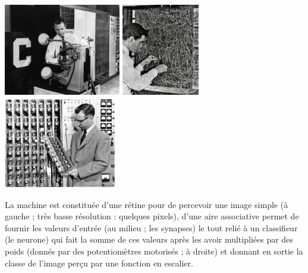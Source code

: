 \documentclass[a4paper,10pt]{report}
\theoremstyle{exo}
\theoremstyle{exercice}
\begin{document}
{\centering\includegraphics[height=4cm]{image/Perceptron1.jpg}
\includegraphics[height=4cm]{image/Perceptron2.jpg}
\includegraphics[height=4cm]{image/Perceptron3.png}\par}


La machine est constituée d'une rétine pour de percevoir une image simple (à gauche ; très basse résolution : quelques pixels), d'une aire associative permet de fournir les valeurs d'entrée (au milieu ; les synapses) le tout relié à un classifieur (le neurone) qui fait la somme de ces valeurs après les avoir multipliées par des poids (donnés par des potentiomètres motorisés ; à droite) et donnant en sortie la classe de l'image perçu par une fonction en escalier.
\end{document}
